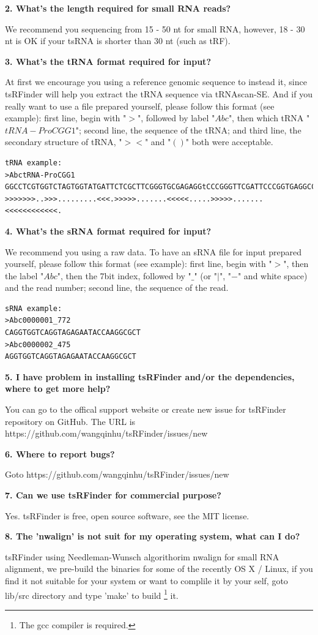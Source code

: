 \documentclass[11pt, a4paper]{article}
\begin{document}
\textbf{2. What's the length required for small RNA reads?}

We recommend you sequencing from 15 - 50 nt for small RNA, however, 18 - 30 nt is OK if your tsRNA is shorter than 30 nt (such as tRF).

\textbf{3. What's the tRNA format required for input?}

At first we encourage you using a reference genomic sequence to instead it, since tsRFinder will help you extract the tRNA sequence via tRNAscan-SE. And if you really want to use a file prepared yourself, please follow this format (see example): first line, begin with "$>$", followed by label "$Abc$", then which tRNA "$tRNA-ProCGG1$";  second line, the sequence of the tRNA; and third line, the secondary structure of tRNA, "$><$" and "$()$" both were acceptable.

{\scriptsize \begin{verbatim}
tRNA example:
>AbctRNA-ProCGG1
GGCCTCGTGGTCTAGTGGTATGATTCTCGCTTCGGGTGCGAGAGGtCCCGGGTTCGATTCCCGGTGAGGCCC
>>>>>>>..>>>.........<<<.>>>>>.......<<<<<.....>>>>>.......<<<<<<<<<<<<.
\end{verbatim}}

\textbf{4. What's the sRNA format required for input?}

We recommend you using a raw data. To have an sRNA file for input prepared yourself, please follow this format (see example): first line, begin with "$>$", then the label "$Abc$", then the 7\-bit index, followed by "$\_$" (or "$|$", "$-$" and white space) and the read number; second line, the sequence of the read.

{\scriptsize \begin{verbatim}
sRNA example:
>Abc0000001_772
CAGGTGGTCAGGTAGAGAATACCAAGGCGCT
>Abc0000002_475
AGGTGGTCAGGTAGAGAATACCAAGGCGCT
\end{verbatim}}


\textbf{5. I have problem in installing tsRFinder and/or the dependencies, where to get more help?}

You can go to the offical support website or create new issue for tsRFinder repository on GitHub. The URL is https://github.com/wangqinhu/tsRFinder/issues/new

\textbf{6. Where to report bugs?}

Goto https://github.com/wangqinhu/tsRFinder/issues/new

\textbf{7. Can we use tsRFinder for commercial purpose?}

Yes. tsRFinder is free, open source software, see the MIT license.

\textbf{8. The 'nwalign' is not suit for my operating system, what can I do?}

tsRFinder using Needleman-Wunsch algorithorim nwalign for small RNA alignment, we pre-build the binaries for some of the recently OS X / Linux, if you find it not suitable for your system or want to complile it by your self, goto lib/src directory and type 'make' to build \footnote{The gcc compiler is required.} it.
\end{document}
